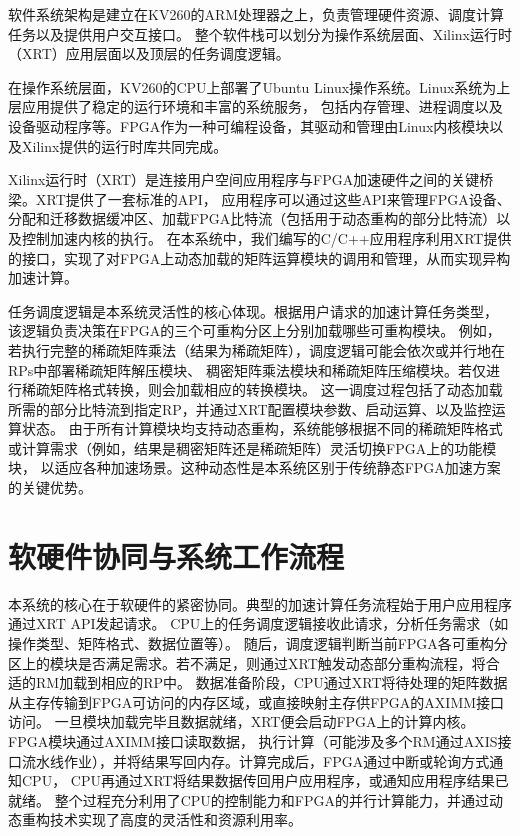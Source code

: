 软件系统架构是建立在KV260的ARM处理器之上，负责管理硬件资源、调度计算任务以及提供用户交互接口。
整个软件栈可以划分为操作系统层面、Xilinx运行时（XRT）应用层面以及顶层的任务调度逻辑。

在操作系统层面，KV260的CPU上部署了Ubuntu Linux操作系统。Linux系统为上层应用提供了稳定的运行环境和丰富的系统服务，
包括内存管理、进程调度以及设备驱动程序等。FPGA作为一种可编程设备，其驱动和管理由Linux内核模块以及Xilinx提供的运行时库共同完成。

Xilinx运行时（XRT）是连接用户空间应用程序与FPGA加速硬件之间的关键桥梁。XRT提供了一套标准的API，
应用程序可以通过这些API来管理FPGA设备、分配和迁移数据缓冲区、加载FPGA比特流（包括用于动态重构的部分比特流）以及控制加速内核的执行。
在本系统中，我们编写的C/C++应用程序利用XRT提供的接口，实现了对FPGA上动态加载的矩阵运算模块的调用和管理，从而实现异构加速计算。

任务调度逻辑是本系统灵活性的核心体现。根据用户请求的加速计算任务类型，
该逻辑负责决策在FPGA的三个可重构分区上分别加载哪些可重构模块。
例如，若执行完整的稀疏矩阵乘法（结果为稀疏矩阵），调度逻辑可能会依次或并行地在RPs中部署稀疏矩阵解压模块、
稠密矩阵乘法模块和稀疏矩阵压缩模块。若仅进行稀疏矩阵格式转换，则会加载相应的转换模块。
这一调度过程包括了动态加载所需的部分比特流到指定RP，并通过XRT配置模块参数、启动运算、以及监控运算状态。
由于所有计算模块均支持动态重构，系统能够根据不同的稀疏矩阵格式或计算需求（例如，结果是稠密矩阵还是稀疏矩阵）灵活切换FPGA上的功能模块，
以适应各种加速场景。这种动态性是本系统区别于传统静态FPGA加速方案的关键优势。

\section{软硬件协同与系统工作流程}

本系统的核心在于软硬件的紧密协同。典型的加速计算任务流程始于用户应用程序通过XRT API发起请求。
CPU上的任务调度逻辑接收此请求，分析任务需求（如操作类型、矩阵格式、数据位置等）。
随后，调度逻辑判断当前FPGA各可重构分区上的模块是否满足需求。若不满足，则通过XRT触发动态部分重构流程，将合适的RM加载到相应的RP中。
数据准备阶段，CPU通过XRT将待处理的矩阵数据从主存传输到FPGA可访问的内存区域，或直接映射主存供FPGA的AXIMM接口访问。
一旦模块加载完毕且数据就绪，XRT便会启动FPGA上的计算内核。FPGA模块通过AXIMM接口读取数据，
执行计算（可能涉及多个RM通过AXIS接口流水线作业），并将结果写回内存。计算完成后，FPGA通过中断或轮询方式通知CPU，
CPU再通过XRT将结果数据传回用户应用程序，或通知应用程序结果已就绪。
整个过程充分利用了CPU的控制能力和FPGA的并行计算能力，并通过动态重构技术实现了高度的灵活性和资源利用率。
